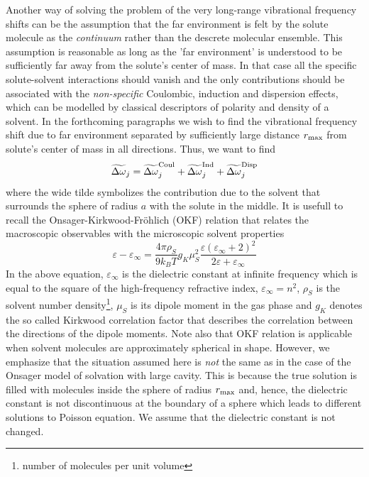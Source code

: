 \documentclass[a4paper,titlepage,twoside,fleqn,12pt]{book}
\begin{document}
\begin{refsection}
Another way of solving the problem of the very long\hyp{}range
vibrational frequency shifts can be the assumption that the
far environment is felt by the solute molecule as the \emph{continuum}
rather than the descrete molecular ensemble. This assumption
is reasonable as long as the 'far environment'
is understood to be sufficiently far away from the solute's
center of mass. In that case all the specific solute\hyp{}solvent
interactions should vanish and the only contributions should be
associated with the \emph{non\hyp{}specific} Coulombic, induction and dispersion
effects,
which can be modelled by classical descriptors of polarity and 
density of a solvent. In the forthcoming paragraphs we wish to find the
vibrational frequency shift due to far environment separated
by sufficiently large distance $r_{\rm max}$ from solute's center of mass
in all directions. Thus, we want to find
%
\begin{equation}
 \widetilde{\Delta\omega}_j = 
\widetilde{\Delta\omega}_j^{\rm Coul} +
\widetilde{\Delta\omega}_j^{\rm Ind} +
\widetilde{\Delta\omega}_j^{\rm Disp}
\end{equation}
%
where the wide tilde symbolizes the contribution
due to the solvent
that surrounds the sphere of radius $a$ with the solute
in the middle. It is usefull to recall 
the Onsager\hyp{}Kirkwood\hyp{}Fr{\"o}hlich (OKF) relation\citep{Valisko.Boda.JPCB.2005}
that relates the macroscopic observables with the microscopic 
solvent properties
%
\begin{equation} \label{e:OKF}
 \varepsilon - \varepsilon_\infty = \frac{4\pi\rho_S}{9k_BT}g_K\mu_S^2 
\frac{\varepsilon(\varepsilon_\infty+2)^2}{2\varepsilon+\varepsilon_\infty}
\end{equation}
%
In the above equation, $\varepsilon_\infty$ is the dielectric constant
at infinite frequency which is equal to the square 
of the high\hyp{}frequency refractive index, $\varepsilon_\infty=n^2$, 
$\rho_S$ is the solvent number density\footnote{number of molecules
per unit volume}, $\mu_S$ is
its dipole moment in the gas phase and $g_K$ denotes the so called
Kirkwood correlation factor\citep{Reis.Iglesias.PCCP.2011} 
that describes the correlation between
the directions of the dipole moments. Note also that 
OKF relation is applicable
when solvent molecules are approximately spherical in shape.
However, we emphasize that the situation assumed here
is \emph{not} the same as in the case of the Onsager model of solvation
with large cavity. This is because the true solution is filled with
molecules inside the sphere of radius $r_{\rm max}$ and, hence, the dielectric constant
is not discontinuous at the boundary of a sphere which leads to different
solutions to Poisson equation. We assume that the dielectric constant is not
changed.


\end{refsection}
\end{document}
